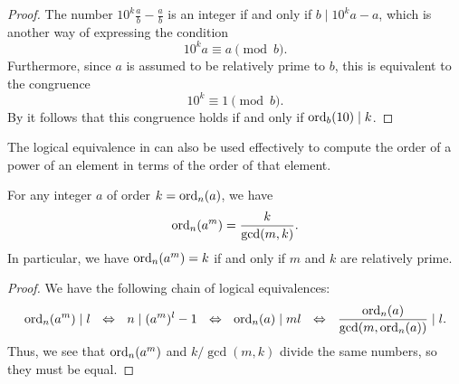 \begin{proof}
  The number $10^k\frac{a}{b}-\frac{a}{b}$ is an integer if and only if $b\mid 10^ka-a$, which is another way of expressing the condition
  \begin{equation*}
    10^ka \equiv a \pmod{b}.
  \end{equation*}
  Furthermore, since $a$ is assumed to be relatively prime to $b$, this is equivalent to the congruence
  \begin{equation*}
    10^k \equiv 1 \pmod{b}.
  \end{equation*}
  By  it follows that this congruence holds if and only if $\operatorname{ord}_b(10)\mid k$.
\end{proof}

The logical equivalence in  can also be used effectively to compute the order of a power of an element in terms of the order of that element.

\begin{theorem}\label{theorem:order-power}
  For any integer $a$ of order $k=\operatorname{ord}_n(a)$, we have
  \begin{equation*}
    \operatorname{ord}_n(a^m)=\frac{k}{\gcd(m,k)}.
  \end{equation*}
  In particular, we have $\operatorname{ord}_n(a^m)=k$ if and only if $m$ and $k$ are relatively prime.
\end{theorem}

\begin{proof}
  We have the following chain of logical equivalences:
  \begin{equation*}
    \operatorname{ord}_n(a^m) \mid l ~~\Leftrightarrow~~ n \mid (a^m)^l-1
    ~~\Leftrightarrow~~ \operatorname{ord}_n(a) \mid ml
    ~~\Leftrightarrow~~ \frac{\operatorname{ord}_n(a)}{\gcd(m,\operatorname{ord}_n(a))} \mid l.
  \end{equation*}
  Thus, we see that $\operatorname{ord}_n(a^m)$ and $k/\gcd(m,k)$ divide the same numbers, so they must be equal.
\end{proof}

